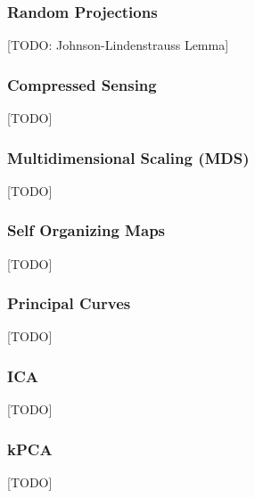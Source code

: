 %





\subsubsection{Random Projections}
[TODO: Johnson-Lindenstrauss Lemma]



\subsubsection{Compressed Sensing}
\label{sec:compressed_sensing}
[TODO]




\subsubsection{Multidimensional Scaling (MDS)}
[TODO]


\subsubsection{Self Organizing Maps}
[TODO]


\subsubsection{Principal Curves}
[TODO]

\subsubsection{ICA}
[TODO]

\subsubsection{kPCA}
[TODO]

